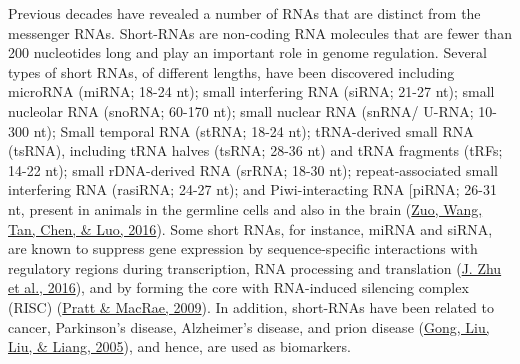 \documentclass[12pt,twoside]{reedthesis}
\begin{document}
Previous decades have revealed a number of RNAs that are distinct from
the messenger RNAs. Short-RNAs are non-coding RNA molecules that are
fewer than 200 nucleotides long and play an important role in genome
regulation. Several types of short RNAs, of different lengths, have been
discovered including microRNA (miRNA; 18-24 nt); small interfering RNA
(siRNA; 21-27 nt); small nucleolar RNA (snoRNA; 60-170 nt); small
nuclear RNA (snRNA/ U-RNA; 10-300 nt); Small temporal RNA (stRNA; 18-24
nt); tRNA-derived small RNA (tsRNA), including tRNA halves (tsRNA; 28-36
nt) and tRNA fragments (tRFs; 14-22 nt); small rDNA-derived RNA (srRNA;
18-30 nt); repeat-associated small interfering RNA (rasiRNA; 24-27 nt);
and Piwi-interacting RNA {[}piRNA; 26-31 nt, present in animals in the
germline cells and also in the brain (\protect\hyperlink{ref-zuo2016}{Zuo, Wang, Tan, Chen, \& Luo, 2016}). Some short RNAs, for
instance, miRNA and siRNA, are known to suppress gene expression by
sequence-specific interactions with regulatory regions during
transcription, RNA processing and translation (\protect\hyperlink{ref-zhu2016}{J. Zhu et al., 2016}), and by forming
the core with RNA-induced silencing complex (RISC) (\protect\hyperlink{ref-pratt2009}{Pratt \& MacRae, 2009}). In
addition, short-RNAs have been related to cancer, Parkinson's disease,
Alzheimer's disease, and prion disease (\protect\hyperlink{ref-gong2005}{Gong, Liu, Liu, \& Liang, 2005}), and hence, are used
as biomarkers.
\end{document}

